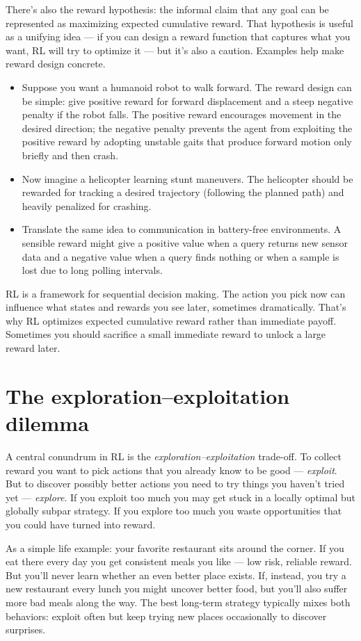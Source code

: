 There’s also the reward hypothesis: the informal claim that any goal can be represented as maximizing expected cumulative reward. That hypothesis is useful as a unifying idea — if you can design a reward function that captures what you want, RL will try to optimize it — but it’s also a caution.
Examples help make reward design concrete. 
\begin{itemize}
    \item Suppose you want a humanoid robot to walk forward. The reward design can be simple: give positive reward for forward displacement and a steep negative penalty if the robot falls. The positive reward encourages movement in the desired direction; the negative penalty prevents the agent from exploiting the positive reward by adopting unstable gaits that produce forward motion only briefly and then crash.
    \item Now imagine a helicopter learning stunt maneuvers. The helicopter should be rewarded for tracking a desired trajectory (following the planned path) and heavily penalized for crashing.
    \item Translate the same idea to communication in battery-free environments. A sensible reward might give a positive value when a query returns new sensor data and a negative value when a query finds nothing or when a sample is lost due to long polling intervals.
\end{itemize}
RL is a framework for sequential decision making. The action you pick now can influence what states and rewards you see later, sometimes dramatically. That’s why RL optimizes expected cumulative reward rather than immediate payoff.
Sometimes you should sacrifice a small immediate reward to unlock a large reward later.

\section{The exploration–exploitation dilemma}
A central conundrum in RL is the \textit{exploration–exploitation} trade-off. To collect reward you want to pick actions that you already know to be good — \textit{exploit}. But to discover possibly better actions you need to try things you haven’t tried yet — \textit{explore}. If you exploit too much you may get stuck in a locally optimal but globally subpar strategy. If you explore too much you waste opportunities that you could have turned into reward.

As a simple life example: your favorite restaurant sits around the corner. If you eat there every day you get consistent meals you like — low risk, reliable reward. But you’ll never learn whether an even better place exists. If, instead, you try a new restaurant every lunch you might uncover better food, but you’ll also suffer more bad meals along the way. The best long-term strategy typically mixes both behaviors: exploit often but keep trying new places occasionally to discover surprises.

